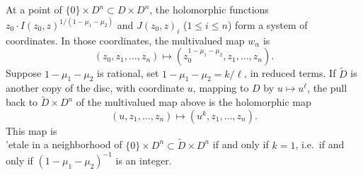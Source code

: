 \documentclass[12pt,a4paper]{article}
\theoremstyle{plain}
\theoremstyle{definition}
\theoremstyle{remark}
\numberwithin{equation}{section}
\begin{document}
At a point of $\{0\} \times D^n \subset D \times D^n$, the holomorphic functions $z_0 \cdot I(z_0, z)^{1/(1 - \mu_1 - \mu_2)}$ and $J(z_0, z)_i$ ($1 \leq i \leq n$) form a system of coordinates. In those coordinates, the multivalued map $w_\alpha$ is
\[
(z_0, z_1, \ldots, z_n) \mapsto (z_0^{1 - \mu_1 - \mu_2}, z_1, \ldots, z_n).
\]
Suppose $1 - \mu_1 - \mu_2$ is rational, set $1 - \mu_1 - \mu_2 = k/\ell$, in reduced terms. If $\widetilde{D}$ is another copy of the disc, with coordinate $u$, mapping to $D$ by $u \mapsto u^\ell$, the pull back to $\widetilde{D} \times D^n$ of the multivalued map above is the holomorphic map
\[
(u, z_1, \ldots, z_n) \mapsto (u^k, z_1, \ldots, z_n).
\]
This map is \\'etale in a neighborhood of $\{0\} \times D^n \subset \widetilde{D} \times D^n$ if and only if $k = 1$, i.e.\ if and only if $(1 - \mu_1 - \mu_2)^{-1}$ is an integer.
\end{document}
